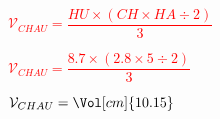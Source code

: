 \begin{corrige}
\begin{enumerate}
        
        \textcolor{red}{$\mathcal{V}_{CHAU} = \dfrac{HU\times (CH \times HA \div 2)}{3}$}

        \medskip
        \textcolor{red}{$\mathcal{V}_{CHAU} = \dfrac{\num{8.7}\times (\num{2.8} \times 5 \div 2)}{3}$}

        \medskip
        \textcolor{red}{$\mathcal{V}_{CHAU} = \Vol[cm]{10.15}$}
    \end{enumerate}
\end{corrige}

